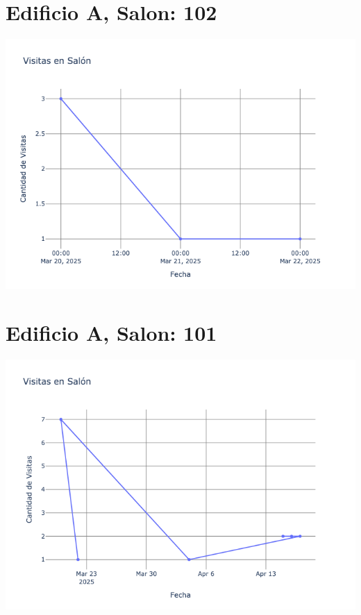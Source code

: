 \documentclass{article}
\begin{document}
    \section{Edificio A, Salon: 102}
    \noindent
    \begin{minipage}{0.48\textwidth}
        \centering
        \includegraphics[width=\textwidth]{../img/poli/VS102-180Dias-17-04-2025.png}
    \end{minipage}
    

    \section{Edificio A, Salon: 101}
    \noindent
    \begin{minipage}{0.48\textwidth}
        \centering
        \includegraphics[width=\textwidth]{../img/poli/VS101-180Dias-17-04-2025.png}
    \end{minipage}
    
\end{document}
